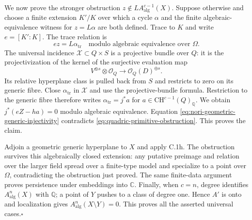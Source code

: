 We now prove the stronger obstruction $z\notin L A^{c-1}_{\mathrm{alg}}(X)$.
Suppose otherwise and choose a finite extension $K'/K$ over
which a cycle $\alpha$ and the finite algebraic-equivalence
witness for $z=L\alpha$ are both defined. Trace to $K$ and
write $e=[K':K]$. The trace relation is
\[
       e z=L\alpha_{\mathrm{tr}}
              \quad\text{modulo algebraic equivalence over }\Omega.
\]
The universal incidence $\mathcal X\subset Q\times S$ is a
projective bundle over $Q$: it is the projectivization of the
kernel of the surjective evaluation map
\[
 V^{\oplus s}\otimes\mathcal O_Q
       \longrightarrow\mathcal O_Q(D)^{\oplus s}.
\]
Its relative hyperplane class is pulled back from $S$ and
restricts to zero on its generic fibre. Close
$\alpha_{\mathrm{tr}}$ in $\mathcal X$ and use the
projective-bundle formula. Restriction to the generic fibre
therefore writes
$\alpha_{\mathrm{tr}}=j^*a$ for
$a\in\mathrm{CH}^{c-1}(Q)_{\mathbb Q}$.
We obtain $j^*(eZ-ha)=0$ modulo algebraic equivalence.
Equation \eqref{eq:nori-geometric-generic-injectivity} contradicts
\eqref{eq:quadric-primitive-obstruction}. This proves the claim.

Adjoin a geometric generic hyperplane to $X$ and apply C.1h.
The obstruction survives this algebraically closed extension:
any putative preimage and relation over the larger field spread
over a finite-type model and specialize to a point over $\Omega$,
contradicting the obstruction just proved. The same finite-data
argument proves persistence under embeddings into $\mathbb C$.
Finally, when $c=n$, degree identifies
$A^n_{\mathrm{alg}}(X)$ with $\mathbb Q$; a point of $Y$
pushes to a class of degree one. Hence $A'$ is onto and
localization gives $A^n_{\mathrm{alg}}(X\setminus Y)=0$.
This proves all the asserted universal cases.\hfill$\square$
